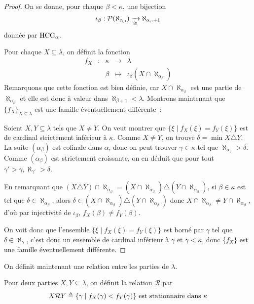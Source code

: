 \begin{proof}
  On se donne, pour chaque $\beta < \kappa$, une bijection
  \[\iota_\beta : \mathcal{P}(\aleph_{\alpha_\beta}) \xrightarrow[\cong]{}
  \aleph_{\alpha_\beta + 1}\]
  donnée par $\operatorname{HCG}_\alpha$.

  Pour chaque $X\subseteq \lambda$, on définit la fonction
  \[\begin{array}{ccccc}
  f_X & : & \kappa & \longrightarrow & \lambda\\
  & & \beta &\longmapsto & \iota_\beta(X \cap \aleph_{\alpha_\beta})
  \end{array}\]
  Remarquons que cette fonction est bien définie, car
  $X\cap \aleph_{\alpha_\beta}$ est une partie de $\aleph_{\alpha_\beta}$ et elle est
  donc à valeur dans $\aleph_{\beta + 1} < \lambda$. Montrons maintenant que
  $\{f_X\}_{X\subseteq \lambda}$ est une famille éventuellement différente~:

  Soient $X,Y\subseteq \lambda$ tels que $X\neq Y$. On veut montrer que
  $\{\xi \mid f_X(\xi) = f_Y(\xi)\}$ est de cardinal strictement inférieur à
  $\kappa$. Comme $X\neq Y$, on trouve $\delta = \min X \triangle Y$. La suite
  $(\alpha_\beta)$ est cofinale dans $\alpha$, donc on peut trouver
  $\gamma\in \kappa$ tel que $\aleph_{\alpha_\gamma} > \delta$. Comme
  $(\alpha_\beta)$ est strictement croissante, on en déduit que pour tout
  $\gamma' > \gamma, \aleph_{\gamma'} > \delta$.

  En remarquant que
  $(X\triangle Y) \cap \aleph_{\alpha_\beta} =
  (X\cap \aleph_{\alpha_\beta})\triangle (Y\cap \aleph_{\alpha_\beta})$,
  si $\beta \in \kappa$ est tel que $\delta \in \aleph_{\alpha_\beta}$, alors
  $\delta\in(X\cap \aleph_{\alpha_\beta})\triangle (Y\cap \aleph_{\alpha_\beta})$
  donc $X\cap \aleph_{\alpha_\beta}\neq Y\cap \aleph_{\alpha_\beta}$,
  d'où par injectivité de $\iota_\beta$, $f_X(\beta) \neq f_Y(\beta)$.

  On voit donc que l'ensemble $\{\xi\mid f_X(\xi) = f_Y(\xi)\}$ est borné par
  $\gamma$ tel que $\delta \in \aleph_\gamma$, c'est donc un ensemble de
  cardinal inférieur à $\gamma$ et $\gamma < \kappa$, donc $\{f_X\}$ est une
  famille éventuellement différente.
\end{proof}

On définit maintenant une relation entre les parties de $\lambda$.

\begin{definition}
  Pour deux parties $X,Y\subseteq \lambda$, on définit la relation
  $\mathcal R$ par
  \[X \mathcal R Y\triangleq \{\gamma\mid f_X(\gamma) < f_Y(\gamma)\}
  \text{ est stationnaire dans }\kappa\]
\end{definition}

